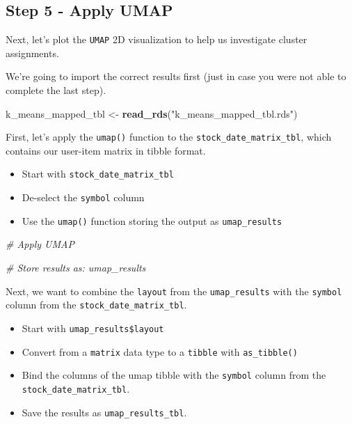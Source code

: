 \documentclass[
]{article}
\newenvironment{Shaded}{\begin{snugshade}}{\end{snugshade}}
\newcommand{\CommentTok}[1]{\textcolor[rgb]{0.56,0.35,0.01}{\textit{#1}}}
\newcommand{\KeywordTok}[1]{\textcolor[rgb]{0.13,0.29,0.53}{\textbf{#1}}}
\newcommand{\NormalTok}[1]{#1}
\newcommand{\StringTok}[1]{\textcolor[rgb]{0.31,0.60,0.02}{#1}}
\providecommand{\tightlist}{%
  \setlength{\itemsep}{0pt}\setlength{\parskip}{0pt}}
\begin{document}
\hypertarget{step-5---apply-umap}{%
\subsection{Step 5 - Apply UMAP}\label{step-5---apply-umap}}

Next, let's plot the \texttt{UMAP} 2D visualization to help us
investigate cluster assignments.

We're going to import the correct results first (just in case you were
not able to complete the last step).

\begin{Shaded}
\begin{Highlighting}[]
\NormalTok{k_means_mapped_tbl <-}\StringTok{ }\KeywordTok{read_rds}\NormalTok{(}\StringTok{"k_means_mapped_tbl.rds"}\NormalTok{)}
\end{Highlighting}
\end{Shaded}

First, let's apply the \texttt{umap()} function to the
\texttt{stock\_date\_matrix\_tbl}, which contains our user-item matrix
in tibble format.

\begin{itemize}
\tightlist
\item
  Start with \texttt{stock\_date\_matrix\_tbl}
\item
  De-select the \texttt{symbol} column
\item
  Use the \texttt{umap()} function storing the output as
  \texttt{umap\_results}
\end{itemize}

\begin{Shaded}
\begin{Highlighting}[]
\CommentTok{# Apply UMAP}

\CommentTok{# Store results as: umap_results }
\end{Highlighting}
\end{Shaded}

Next, we want to combine the \texttt{layout} from the
\texttt{umap\_results} with the \texttt{symbol} column from the
\texttt{stock\_date\_matrix\_tbl}.

\begin{itemize}
\tightlist
\item
  Start with \texttt{umap\_results\$layout}
\item
  Convert from a \texttt{matrix} data type to a \texttt{tibble} with
  \texttt{as\_tibble()}
\item
  Bind the columns of the umap tibble with the \texttt{symbol} column
  from the \texttt{stock\_date\_matrix\_tbl}.
\item
  Save the results as \texttt{umap\_results\_tbl}.
\end{itemize}
\end{document}

